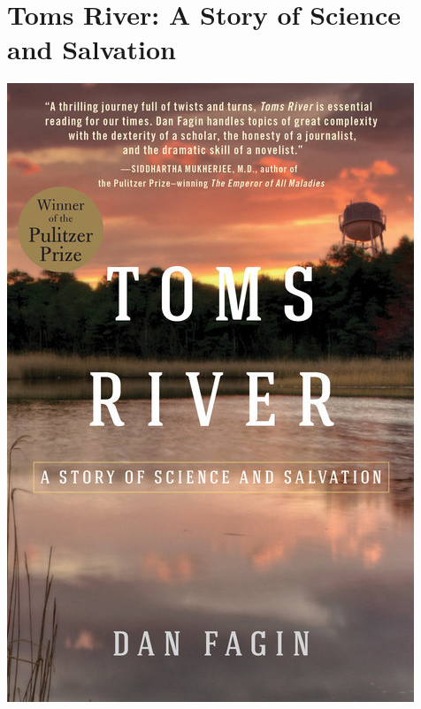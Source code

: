 \documentclass{tufte-handout}
\makeatletter
\newcommand{\varcaption}[2][0pt]{%
  \gsetlength{\@tufte@caption@vertical@offset}{-#1}%
  \gdef\@tufte@stored@varcaption{#2}%
}
\gdef\@tufte@stored@varcaption{} %
\makeatother
\begin{document}
\section*{Toms River: A Story of Science and Salvation}
\begin{marginfigure}[\baselineskip]
   \includegraphics[width=\linewidth]{images/toms_river.jpg}
   \varcaption{\href{https://islandpress.org/books/toms-river}{Publisher Link}, \href{https://www.amazon.com/Toms-River-Story-Science-Salvation/dp/1610915917/}{Amazon Link}}
\end{marginfigure}
\end{document}
